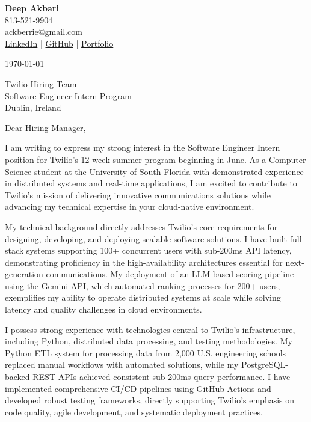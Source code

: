 \documentclass[11pt]{article}
\begin{document}
\textbf{Deep Akbari}\\
813-521-9904\\
ackberrie@gmail.com\\
\href{https://www.linkedin.com/in/deep-akbari/}{LinkedIn} | \href{https://github.com/ackberry}{GitHub} | \href{https://ackberry.club/}{Portfolio}

\vspace{1em}

\today

\vspace{1em}

Twilio Hiring Team\\
Software Engineer Intern Program\\
Dublin, Ireland

\vspace{1em}

Dear Hiring Manager,

I am writing to express my strong interest in the Software Engineer Intern position for Twilio's 12-week summer program beginning in June. As a Computer Science student at the University of South Florida with demonstrated experience in distributed systems and real-time applications, I am excited to contribute to Twilio's mission of delivering innovative communications solutions while advancing my technical expertise in your cloud-native environment.

My technical background directly addresses Twilio's core requirements for designing, developing, and deploying scalable software solutions. I have built full-stack systems supporting 100+ concurrent users with sub-200ms API latency, demonstrating proficiency in the high-availability architectures essential for next-generation communications. My deployment of an LLM-based scoring pipeline using the Gemini API, which automated ranking processes for 200+ users, exemplifies my ability to operate distributed systems at scale while solving latency and quality challenges in cloud environments.

I possess strong experience with technologies central to Twilio's infrastructure, including Python, distributed data processing, and testing methodologies. My Python ETL system for processing data from 2,000 U.S. engineering schools replaced manual workflows with automated solutions, while my PostgreSQL-backed REST APIs achieved consistent sub-200ms query performance. I have implemented comprehensive CI/CD pipelines using GitHub Actions and developed robust testing frameworks, directly supporting Twilio's emphasis on code quality, agile development, and systematic deployment practices.
\end{document}
